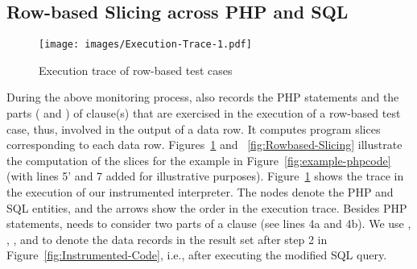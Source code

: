 \subsection{Row-based Slicing across PHP and SQL}

\begin{figure}[tbp]
  \centering
  \texttt{[image: images/Execution-Trace-1.pdf]}\\
  \caption{Execution trace of row-based test cases}\label{fig:Execution-Trace}
\end{figure}



During the above monitoring process, {\tool} also records the PHP
statements and the parts ( and ) of
 clause(s) that are exercised in the execution of a
row-based test case, thus, involved in the output of a data row. It
computes program slices corresponding to each data row.
Figures~\ref{fig:Execution-Trace} and ~\ref{fig:Rowbased-Slicing}
illustrate the computation of the slices for the example in
Figure~\ref{fig:example-phpcode} (with lines 5' and 7 added for
illustrative purposes). Figure~\ref{fig:Execution-Trace} shows the
trace in the execution of our instrumented interpreter. The
nodes denote the PHP and SQL entities, and the arrows show the order
in the execution trace. Besides PHP statements, {\tool} needs to
consider two parts of a  clause (see lines 4a and 4b).
We use , , , and
 to denote the data records in the result set 
after step 2 in Figure~\ref{fig:Instrumented-Code}, i.e., after
executing the modified SQL query.

